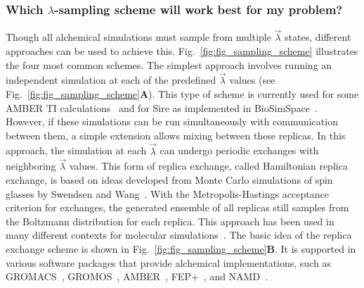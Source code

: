\documentclass[9pt,bestpractices]{livecoms}
\begin{document}
\subsubsection{Which $\lambda$-sampling scheme will work best for my problem?}
\label{sec:sampling_schemes}
Though all alchemical simulations must sample from multiple $\vec{\lambda}$ states, different approaches can be used to achieve this. Fig.~\ref{fig:fig_sampling_scheme} illustrates the four most common schemes. The simplest approach involves running an independent simulation at each of the predefined $\vec{\lambda}$ values (see Fig.~\ref{fig:fig_sampling_scheme}\textbf{A}). This type of scheme is currently used for some AMBER TI calculations~\cite{song2019using} and for Sire as implemented in BioSimSpace~\cite{hedges2019biosimspace}. However, if these simulations can be run simultaneously with communication between them, a simple extension allows mixing between these replicas. In this approach, the simulation at each $\vec{\lambda}$ can undergo periodic exchanges with neighboring $\vec{\lambda}$ values. This form of replica exchange, called Hamiltonian replica exchange, is based on ideas developed from Monte Carlo simulations of spin glasses by Swendsen and Wang~\cite{swendsen1986replica}. With the Metropolis-Hastings acceptance criterion for exchanges, the generated ensemble of all replicas still samples from the Boltzmann distribution for each replica. This approach has been used in many different contexts for molecular simulations~\cite{sugita2000multidimensional,sugita1999replicaexchange, woods2003development, jiang2010free}. The basic idea of the replica exchange scheme is shown in Fig.~\ref{fig:fig_sampling_scheme}\textbf{B}. It is supported in various software packages that provide alchemical implementations, such as GROMACS~\cite{aldeghi2015accurate}, GROMOS~\cite{hritz2008hamiltonian,hritz2007optimization},
AMBER~\cite{Lee_JChemInfModel_2020_v60_p5595}, FEP+~\cite{wang2015accurate}, and NAMD~\cite{jiang2019computing}.
\end{document}
